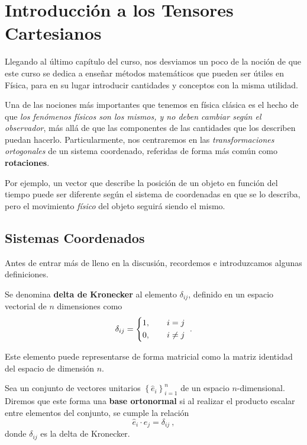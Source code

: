 \chapter{Introducción a los Tensores Cartesianos}

Llegando al último capítulo del curso, nos desviamos un poco de la noción de que este curso se dedica a enseñar métodos matemáticos que pueden ser útiles en Física, para en su lugar introducir cantidades y conceptos con la misma utilidad.

Una de las nociones más importantes que tenemos en física clásica es el hecho de que \emph{los fenómenos físicos son los mismos, y no deben cambiar según el observador}, más allá de que las componentes de las cantidades que los describen puedan hacerlo. Particularmente, nos centraremos en las \emph{transformaciones ortogonales} de un sistema coordenado, referidas de forma más común como \textbf{rotaciones}. 

Por ejemplo, un vector que describe la posición de un objeto en función del tiempo puede ser diferente según el sistema de coordenadas en que se lo describa, pero el movimiento \emph{físico} del objeto seguirá siendo el mismo.

\section{Sistemas Coordenados}

Antes de entrar más de lleno en la discusión, recordemos e introduzcamos algunas definiciones.

\begin{defi} 
    Se denomina \textbf{delta de Kronecker} al elemento $\delta_{ij}$, definido en un espacio vectorial de $n$ dimensiones como
    \begin{equation}
        \delta_{ij} = \begin{dcases}
            1, \qquad i = j \\
            0, \qquad i \neq j
        \end{dcases} \ .
    \end{equation} 

    Este elemento puede representarse de forma matricial como la matriz identidad del espacio de dimensión $n$.
\end{defi}

\newpage

\begin{defi} 
    Sea un conjunto de vectores unitarios $\left\{ \hat{e}_i\right\}_{i=1}^n$ de un espacio $n$-dimensional. Diremos que este forma una \textbf{base ortonormal} si al realizar el producto escalar entre elementos del conjunto, se cumple la relación
    \begin{equation}
        \hat{e}_i\cdot \hat{e}_j = \delta_{ij} \ ,
    \end{equation}
    donde $\delta_{ij}$ es la delta de Kronecker.
\end{defi}

